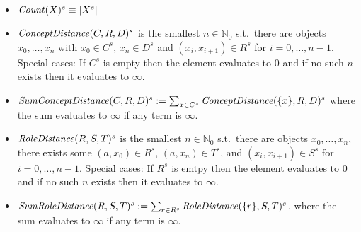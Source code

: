 \documentclass{article}
\begin{document}
\begin{itemize}
    \item $\mathit{Count}(X)^s\equiv |X^s|$
    \item $\mathit{ConceptDistance}(C, R, D)^s$ is the smallest $n\in\mathbb{N}_0$
    s.t.\ there are objects $x_0,\ldots,x_n$ with
    $x_0\in C^s$, $x_n\in D^s$ and $(x_i, x_{i+1})\in R^s$ for $i = 0,\ldots,n-1$.
    Special cases: If $C^s$ is empty then the element evaluates to $0$ and if no such $n$ exists then it evaluates to $\infty$.
    \item $\mathit{SumConceptDistance}(C, R, D)^s:=\sum_{x\in C^s}\mathit{ConceptDistance}(\{x\}, R, D)^s$
    where the sum evaluates to $\infty$ if any term is $\infty$.
    \item $\mathit{RoleDistance}(R, S, T)^s$ is the smallest $n\in\mathbb{N}_0$
    s.t.\ there are objects $x_0,\ldots,x_n$,
    there exists some $(a,x_0)\in R^s$, $(a,x_n)\in T^s$,
    and $(x_i, x_{i+1})\in S^s$ for $i = 0,\ldots,n-1$.
    Special cases: If $R^s$ is emtpy then the element evaluates to $0$ and if no such $n$ exists then it evaluates to $\infty$.
    \item $\mathit{SumRoleDistance}(R, S, T)^s:=\sum_{r\in R^s}\mathit{RoleDistance}(\{r\}, S, T)^s$,
    where the sum evaluates to $\infty$ if any term is $\infty$.
\end{itemize}



\end{document}
